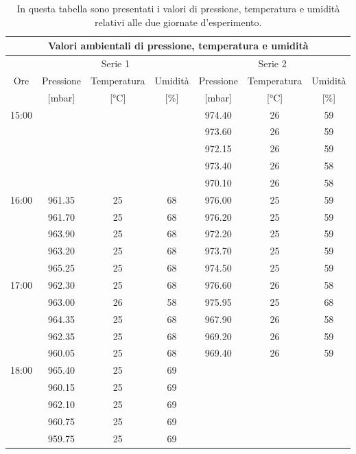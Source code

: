 \begin{table}
    \begin{tabular}{c | c c c | c c c}
	    \multicolumn{7}{c}{\textbf{Valori ambientali di pressione, temperatura e umidità}} \\
        \toprule
        \multicolumn{1}{c}{} & \multicolumn{3}{c}{Serie 1} & \multicolumn{3}{c}{Serie 2} \\
        Ore & Pressione & Temperatura & Umidità & Pressione & Temperatura & Umidità \\
         & [\si{\milli\bar}] & [\si{\celsius}] & [\%] & [\si{\milli\bar}] & [\si{\celsius}] & [\%] \\
        \midrule
        \multirow{5}{*}{15:00} & $\,$ & $\,$ & $\,$ & 974.40 & 26 & 59 \\
         & $\,$ & $\,$ & $\,$ & 973.60 & 26 & 59 \\
         & $\,$ & $\,$ & $\,$ & 972.15 & 26 & 59 \\
         & $\,$ & $\,$ & $\,$ & 973.40 & 26 & 58 \\
         & $\,$ & $\,$ & $\,$ & 970.10 & 26 & 58 \\
        \midrule
        \multirow{5}{*}{16:00} & 961.35 & 25 & 68 & 976.00 & 25 & 59 \\
         & 961.70 & 25 & 68 & 976.20 & 25 & 59 \\
         & 963.90 & 25 & 68 & 972.20 & 25 & 59 \\
         & 963.20 & 25 & 68 & 973.70 & 25 & 59 \\
         & 965.25 & 25 & 68 & 974.50 & 25 & 59 \\
        \midrule
        \multirow{5}{*}{17:00} & 962.30 & 25 & 68 & 976.60 & 26 & 58 \\
         & 963.00 & 26 & 58 & 975.95 & 25 & 68 \\
         & 964.35 & 25 & 68 & 967.90 & 26 & 58\\
         & 962.35 & 25 & 68 & 969.20 & 26 & 59\\
         & 960.05 & 25 & 68 & 969.40 & 26 & 59 \\
        \midrule
        \multirow{5}{*}{18:00} & 965.40 & 25 & 69 & $\,$ & $\,$ & $\,$ \\
         & 960.15 & 25 & 69 & $\,$ & $\,$ & $\,$ \\
         & 962.10 & 25 & 69 & $\,$ & $\,$ & $\,$ \\
         & 960.75 & 25 & 69 & $\,$ & $\,$ & $\,$ \\
         & 959.75 & 25 & 69 & $\,$ & $\,$ & $\,$ \\
        \bottomrule
    \end{tabular}


    \caption{In questa tabella sono presentati i valori di pressione, temperatura e umidità relativi alle due giornate d'esperimento.}
    \label{tab:ptu}
\end{table}
